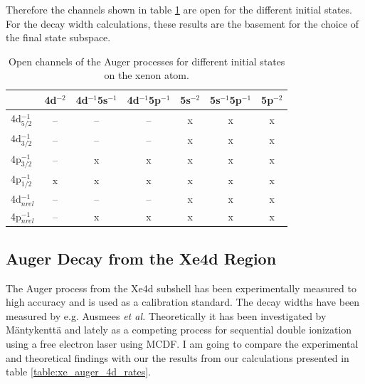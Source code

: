 Therefore the channels shown in table \ref{table:Xe_open_channels} are
open for the different initial states. For the decay width calculations, these
results are the basement for the choice of the final state subspace.
\begin{table}[h]
  \centering
  \caption{Open channels of the Auger processes for different initial states
           on the xenon atom.}
  \begin{tabular}{lcccccc}
   \toprule
                   & 4d$^{-2}$ & 4d$^{-1}$5s$^{-1}$ & 4d$^{-1}$5p$^{-1}$ & 5s$^{-2}$ & 5s$^{-1}$5p$^{-1}$ & 5p$^{-2}$ \\
   \midrule
   4d$_{5/2}^{-1}$ &      --   &       --           &        --          &     x     &     x              &     x     \\
   4d$_{3/2}^{-1}$ &      --   &       --           &        --          &     x     &     x              &     x     \\
   4p$_{3/2}^{-1}$ &      --   &        x           &         x          &     x     &     x              &     x     \\
   4p$_{1/2}^{-1}$ &       x   &        x           &         x          &     x     &     x              &     x     \\
   \midrule
   4d$^{-1}_{nrel}$&      --   &       --           &        --          &     x     &     x              &     x     \\
   4p$^{-1}_{nrel}$&      --   &        x           &         x          &     x     &     x              &     x     \\
   \bottomrule
  \end{tabular}
  \label{table:Xe_open_channels}
\end{table}




\subsection{Auger Decay from the Xe4d Region}

The Auger process from the Xe4d subshell has been experimentally
measured to high accuracy and is used as a calibration standard. \cite{Carroll02}
The decay widths have been measured  by e.g. Ausmees \textit{et al.}
\cite{Ausmees99,Aksela94}
Theoretically it has been investigated  by Mäntykenttä \cite{Maentykenttae93}
and lately as a competing process for
sequential double ionization using a free electron laser \cite{Fritzsche11}
using \ac{MCDF}. 
I am going to compare the experimental and theoretical findings with our 
the results from our calculations presented in table \ref{table:xe_auger_4d_rates}.

